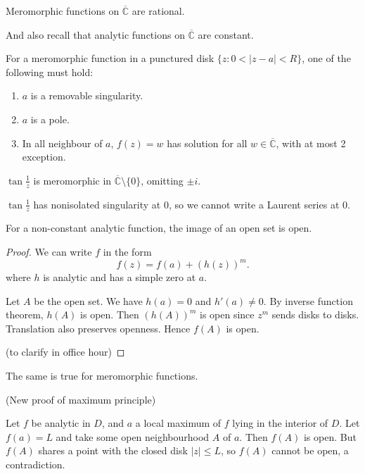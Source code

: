 \begin{theorem}
	Meromorphic functions on $\overline{\mathbb{C}} $ are rational.
\end{theorem}
And also recall that analytic functions on $\overline{\mathbb{C}} $ are constant.

\begin{theorem}
	For a meromorphic function in a punctured disk $\{z : 0 < |z-a| < R\} $, one of the following must hold:
	\begin{enumerate}
		\item $a$ is a removable singularity.
		\item $a $ is a pole.
		\item In all neighbour of $a$, $f(z) = w$ has solution for all $w \in \overline{\mathbb{C}} $, with at most 2 exception.
	\end{enumerate}
\end{theorem}
\begin{example}
	$\tan \frac{1}{z}$ is meromorphic in $\overline{\mathbb{C}} \setminus \{0\} $, omitting $ \pm i$. 

	$\tan \frac{1}{z}$ has nonisolated singularity at $0$, so we cannot write a Laurent series at $0$.
\end{example}

\begin{theorem}
	For a non-constant analytic function, the image of an open set is open.
\end{theorem}
\begin{proof}
	We can write $f$ in the form
	\[
		f(z) = f(a) + \left( h(z) \right) ^m
	.\] 
	where $h$ is analytic and has a simple zero at $a$.

	Let $A$ be the open set. We have $h(a) = 0$ and $h'(a) \neq 0$. By inverse function theorem, $h(A)$ is open. Then $\left( h(A) \right) ^m$ is open since $z^m$ sends disks to disks. Translation also preserves openness. Hence $f(A)$ is open.

	(to clarify in office hour)
\end{proof}
The same is true for meromorphic functions.

\begin{example}
	(New proof of maximum principle)

	Let $f$ be analytic in $D$, and $a$ a local maximum of $f$ lying in the interior of $D$. Let $f(a) = L$ and take some open neighbourhood $A$ of $a$. Then $f(A)$ is open. But $f(A)$ shares a point with the closed disk $|z| \le L$, so $f(A) $ cannot be open, a contradiction.
\end{example}

